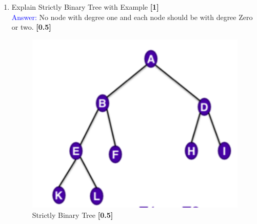 \documentclass[12pt ,a4paper]{exam}
\begin{document}
\begin{enumerate}[start=1,label={\bfseries Q\arabic*)}]
\begin{itemize}
		 \end{itemize}
		 \pagebreak
	    \item Explain Strictly Binary Tree with Example \hfill \textbf{[1]}\\
	    \textcolor{blue}{Answer: } No node with degree one and each node should be with degree Zero or two.  \hfill \textbf{[0.5]}
	    \begin{figure}[h]
	    	\centering
	    	\includegraphics[width=0.4\linewidth]{"Screenshot 2020-12-26 at 9.15.19 AM"}
	    	\caption{Strictly Binary Tree  \hfill \textbf{[0.5]}}
	    	\label{fig:screenshot-2020-12-26-at-9}
	    \end{figure}
	    

\end{enumerate}
\end{document}
